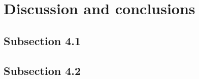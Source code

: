 \section{Discussion and conclusions}
\label{sec:results}
\subsection{Subsection 4.1}

\subsection{Subsection 4.2}




\FloatBarrier %